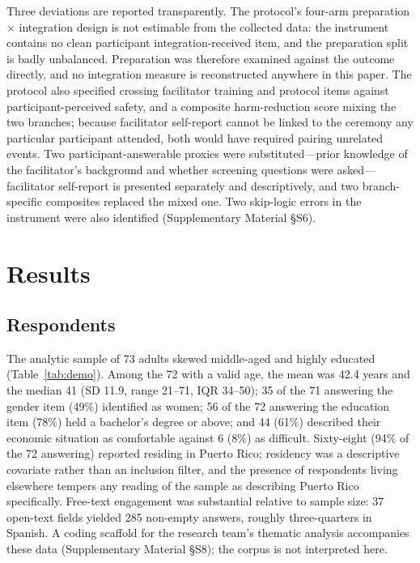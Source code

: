 \documentclass[12pt]{article}
\begin{document}
Three deviations are reported transparently. The protocol's four-arm preparation $\times$ integration
design is not estimable from the collected data: the instrument contains no clean participant
integration-received item, and the preparation split is badly unbalanced. Preparation was therefore
examined against the outcome directly, and no integration measure is reconstructed anywhere in this paper.
The protocol also specified crossing facilitator training and protocol items against participant-perceived
safety, and a composite harm-reduction score mixing the two branches; because facilitator self-report
cannot be linked to the ceremony any particular participant attended, both would have required pairing
unrelated events. Two participant-answerable proxies were substituted---prior knowledge of the
facilitator's background and whether screening questions were asked---facilitator self-report is presented
separately and descriptively, and two branch-specific composites replaced the mixed one. Two skip-logic
errors in the instrument were also identified (Supplementary Material \S S6).

\section{Results}

\subsection{Respondents}

The analytic sample of 73 adults skewed middle-aged and highly educated (Table~\ref{tab:demo}). Among the
72 with a valid age, the mean was 42.4 years and the median 41 (SD 11.9, range 21--71, IQR 34--50); 35 of
the 71 answering the gender item (49\%) identified as women; 56 of the 72 answering the education item
(78\%) held a bachelor's degree or above; and 44 (61\%) described their economic situation as comfortable
against 6 (8\%) as difficult. Sixty-eight (94\% of the 72 answering) reported residing in Puerto Rico;
residency was a descriptive covariate rather than an inclusion filter, and the presence of respondents
living elsewhere tempers any reading of the sample as describing Puerto Rico specifically. Free-text
engagement was substantial relative to sample size: 37 open-text fields yielded 285 non-empty answers,
roughly three-quarters in Spanish. A coding scaffold for the research team's thematic analysis accompanies
these data (Supplementary Material \S S8); the corpus is not interpreted here.
\end{document}

